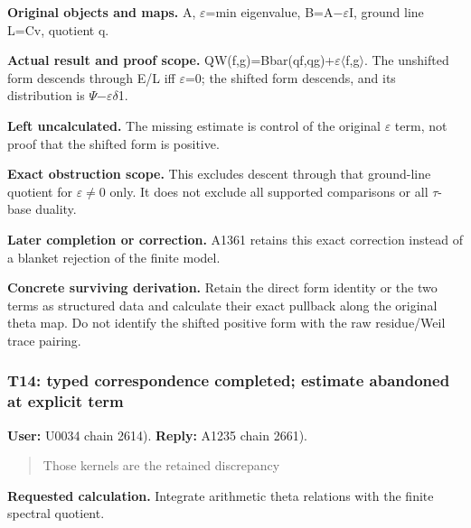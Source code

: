 \documentclass[10pt,a4paper,oneside]{report}
\begin{document}
\textbf{Original objects and maps.} A,
\allowbreak{}\ensuremath{ε}\allowbreak{}=min eigenvalue,
B=A\allowbreak{}\ensuremath{−}\allowbreak{}\allowbreak{}\ensuremath{ε}\allowbreak{}I,
ground line L=Cv, quotient q.

\textbf{Actual result and proof scope.}
QW(f,g)=Bbar(qf,qg)+\allowbreak{}\ensuremath{ε}\allowbreak{}\allowbreak{}\ensuremath{\langle}\allowbreak{}f,g\allowbreak{}\ensuremath{\rangle}\allowbreak{}.
The unshifted form descends through E/L iff
\allowbreak{}\ensuremath{ε}\allowbreak{}=0; the shifted form descends,
and its distribution is
\allowbreak{}\ensuremath{Ψ}\allowbreak{}\allowbreak{}\ensuremath{−}\allowbreak{}\allowbreak{}\ensuremath{ε}\allowbreak{}\allowbreak{}\ensuremath{δ}\allowbreak{}1.

\textbf{Left uncalculated.} The missing estimate is control of the
original \allowbreak{}\ensuremath{ε}\allowbreak{} term, not proof that
the shifted form is positive.

\textbf{Exact obstruction scope.} This excludes descent through that
ground-line quotient for
\allowbreak{}\ensuremath{ε}\allowbreak{}\allowbreak{}\ensuremath{≠}\allowbreak{}0
only. It does not exclude all supported comparisons or all
\allowbreak{}\ensuremath{τ}\allowbreak{}-base duality.

\textbf{Later completion or correction.} A1361 retains this exact
correction instead of a blanket rejection of the finite model.

\textbf{Concrete surviving derivation.} Retain the direct form identity
or the two terms as structured data and calculate their exact pullback
along the original theta map. Do not identify the shifted positive form
with the raw residue/Weil trace pairing.

\subsubsection{T14: typed correspondence completed; estimate abandoned
at explicit
term}\label{t14-typed-correspondence-completed-estimate-abandoned-at-explicit-term}

\textbf{User:} U0034
\protect{} chain 2614).
\textbf{Reply:} A1235
\protect{} chain 2661).

\begin{quote}
Those kernels are the retained discrepancy
\end{quote}

\textbf{Requested calculation.} Integrate arithmetic theta relations
with the finite spectral quotient.
\end{document}
